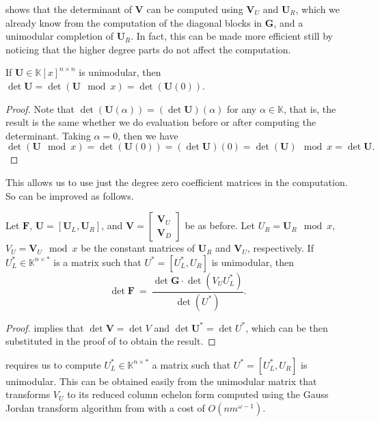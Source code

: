  shows that the determinant of
$\mathbf{V}$ can be computed using $\mathbf{V}_{U}$ and $\mathbf{U}_{R}$,
which we already know from the computation of the diagonal blocks
in $\mathbf{G}$, and a unimodular completion of $\mathbf{U}_{R}$.
In fact, this can be made more efficient still by noticing that the
higher degree parts do not affect the computation.
\begin{lem}
\label{lem:determinantOfUnimodular}If $\mathbf{U}\in\mathbb{K}\left[x\right]^{n\times n}$
is unimodular, then $\det\mathbf{U}=\det\left(\mathbf{U}\mod x\right)=\det\left(\mathbf{U}\left(0\right)\right)$.\end{lem}
\begin{proof}
Note that $\det\left(\mathbf{U}\left(\alpha\right)\right)=\left(\det\mathbf{U}\right)\left(\alpha\right)$
for any $\alpha\in\mathbb{K}$, that is, the result is the same whether
we do evaluation before or after computing the determinant. Taking
$\alpha=0$, then we have 
\[
\det\left(\mathbf{U}\mod x\right)=\det\left(\mathbf{U}\left(0\right)\right)=\left(\det\mathbf{U}\right)\left(0\right)=\det\left(\mathbf{U}\right)\mod x=\det\mathbf{U}.
\]

\end{proof}
This allows us to use just the degree zero coefficient matrices in
the computation. So  can be improved
as follows.
\begin{lem}
\label{lem:scalingToDeterminantSimplified} Let $\mathbf{F}$, $\mathbf{U}=\left[\mathbf{U}_{L},\mathbf{U}_{R}\right]$,
and $\mathbf{V}=\begin{bmatrix}\mathbf{V}_{U}\\
\mathbf{V}_{D}
\end{bmatrix}$ be as before. Let $U_{R}=\mathbf{U}_{R}\mod x$, $V_{U}=\mathbf{V}_{U}\mod x$
be the constant matrices of $\mathbf{U}_{R}$ and $\mathbf{V}_{U}$,
respectively. If $U_{L}^{*}\in\mathbb{K}^{n\times*}$ is a matrix
such that $U^{*}=\left[U_{L}^{*},U_{R}\right]$ is unimodular, then
\[
\det\mathbf{F}~=~\frac{\det\mathbf{G}\cdot\det\left(V_{U}U_{L}^{*}\right)}{\det\left(U^{*}\right)}.
\]
 \end{lem}
\begin{proof}
 implies that $\det\mathbf{V}=\det V$
and $\det\mathbf{U}^{*}=\det U^{*}$, which can be then substituted
in the proof of  to obtain the
result.\end{proof}
\begin{rem}
 requires us to compute
$U_{L}^{*}\in\mathbb{K}^{n\times*}$ a matrix such that $U^{*}=\left[U_{L}^{*},U_{R}\right]$
is unimodular. This can be obtained easily from the unimodular matrix
that transforms $V_{U}$ to its reduced column echelon form computed
using the Gauss Jordan transform algorithm from \citet{storjohann:phd2000}
with a cost of $O\left(nm^{\omega-1}\right)$. 
\end{rem}
